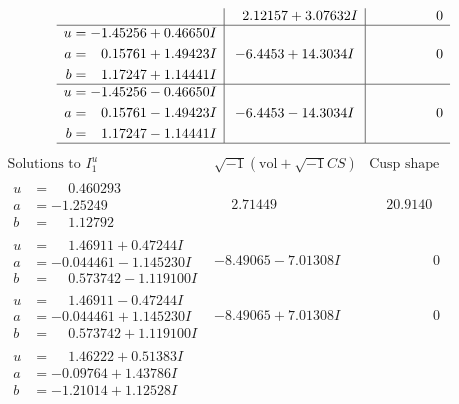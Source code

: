 \documentclass[1p]{elsarticle_modified}
\theoremstyle{definition}
\newcommand{\I}{\sqrt{-1}}
\begin{document}
$$\begin{array}{c|c|c}
 & \phantom{-}2.12157 + 3.07632 I & \phantom{-0.000000 } 0 \\ \hline\begin{aligned}
u &= -1.45256 + 0.46650 I \\
a &= \phantom{-}0.15761 + 1.49423 I \\
b &= \phantom{-}1.17247 + 1.14441 I\end{aligned}
 & -6.4453 + 14.3034 I & \phantom{-0.000000 } 0 \\ \hline\begin{aligned}
u &= -1.45256 - 0.46650 I \\
a &= \phantom{-}0.15761 - 1.49423 I \\
b &= \phantom{-}1.17247 - 1.14441 I\end{aligned}
 & -6.4453 - 14.3034 I & \phantom{-0.000000 } 0\\
 \hline 
 \end{array}$$\newpage$$\begin{array}{c|c|c}  
\text{Solutions to }I^u_{1}& \I (\text{vol} + \sqrt{-1}CS) & \text{Cusp shape}\\
 \hline 
\begin{aligned}
u &= \phantom{-}0.460293\phantom{ +0.000000I} \\
a &= -1.25249\phantom{ +0.000000I} \\
b &= \phantom{-}1.12792\phantom{ +0.000000I}\end{aligned}
 & \phantom{-}2.71449\phantom{ +0.000000I} & \phantom{-}20.9140\phantom{ +0.000000I} \\ \hline\begin{aligned}
u &= \phantom{-}1.46911 + 0.47244 I \\
a &= -0.044461 - 1.145230 I \\
b &= \phantom{-}0.573742 - 1.119100 I\end{aligned}
 & -8.49065 - 7.01308 I & \phantom{-0.000000 } 0 \\ \hline\begin{aligned}
u &= \phantom{-}1.46911 - 0.47244 I \\
a &= -0.044461 + 1.145230 I \\
b &= \phantom{-}0.573742 + 1.119100 I\end{aligned}
 & -8.49065 + 7.01308 I & \phantom{-0.000000 } 0 \\ \hline\begin{aligned}
u &= \phantom{-}1.46222 + 0.51383 I \\
a &= -0.09764 + 1.43786 I \\
b &= -1.21014 + 1.12528 I\end{aligned}

\end{array}$$
\end{document}
